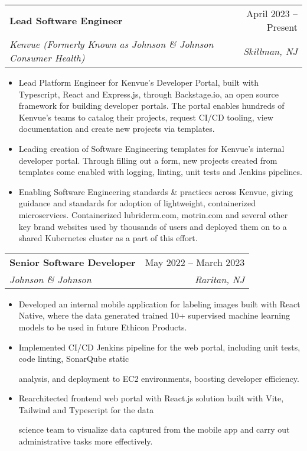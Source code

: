 \documentclass[letterpaper,11pt]{article}
\makeatletter
\newcommand{\resumeItem}[1]{
  \item\small{
    {#1 \vspace{-2pt}}
  }
}
\newcommand{\resumeSubheading}[4]{
  \vspace{-2pt}\item
    \begin{tabular*}{0.95\textwidth}[t]{l@{\extracolsep{\fill}}r}
      \textbf{#1} & #2 \\
      \textit{\small#3} & \textit{\small #4} \\
    \end{tabular*}\vspace{-7pt}
}
\newcommand{\resumeItemListStart}{\begin{itemize}}
\newcommand{\resumeItemListEnd}{\end{itemize}\vspace{-7pt}}
\makeatother
\begin{document}
    \resumeSubheading
      {Lead Software Engineer}{April 2023 -- Present}
      {Kenvue (Formerly Known as Johnson \& Johnson Consumer Health)}{Skillman, NJ}
      \resumeItemListStart
        \resumeItem{Lead Platform Engineer for Kenvue's Developer Portal, built with Typescript, React and Express.js, through Backstage.io, an open source framework for building developer portals. The portal enables hundreds of Kenvue's teams to catalog their projects, request CI/CD tooling, view documentation and create new projects via templates. }
        \resumeItem{Leading creation of Software Engineering templates for Kenvue's internal developer portal. Through filling out
         a form, new projects created from templates come enabled with logging, linting, unit tests and Jenkins pipelines.}
        \resumeItem{Enabling Software Engineering standards \& practices across Kenvue, giving guidance and standards 
        for adoption of lightweight, containerized microservices. Containerized lubriderm.com, motrin.com and several other
        key brand websites used by thousands of users and deployed them on to a shared Kubernetes cluster as a part of this effort. }
    \resumeItemListEnd

    \resumeSubheading
      {Senior Software Developer}{May 2022 -- March 2023}
      {Johnson \& Johnson}{Raritan, NJ}
      \resumeItemListStart
        \resumeItem{Developed an internal mobile application for labeling images built with React Native, where the data generated trained 10+ supervised machine learning models to be used in future Ethicon Products.}
        \resumeItem{Implemented CI/CD Jenkins pipeline for the web portal, including unit tests, code linting, SonarQube static 
        
        analysis, and deployment to EC2 environments, boosting developer efficiency.}
        \resumeItem{Rearchitected frontend web portal with React.js solution built with Vite, Tailwind and Typescript for the data
        
         science team to visualize data captured from the mobile app and carry out administrative tasks more effectively.}
      \resumeItemListEnd
\end{document}
